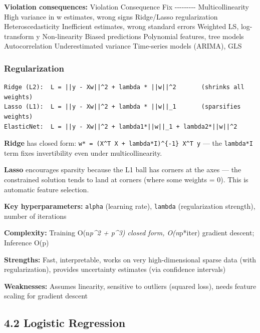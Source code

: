 \documentclass[11pt]{article}
\begin{document}
\textbf{Violation consequences:}
\textbar{} Violation \textbar{} Consequence \textbar{} Fix \textbar{}
\textbar-\/-\/-\textbar-\/-\/-\textbar-\/-\/-\textbar{}
\textbar{} Multicollinearity \textbar{} High variance in w estimates, wrong signs \textbar{} Ridge/Lasso regularization \textbar{}
\textbar{} Heteroscedasticity \textbar{} Inefficient estimates, wrong standard errors \textbar{} Weighted LS, log-transform y \textbar{}
\textbar{} Non-linearity \textbar{} Biased predictions \textbar{} Polynomial features, tree models \textbar{}
\textbar{} Autocorrelation \textbar{} Underestimated variance \textbar{} Time-series models (ARIMA), GLS \textbar{}

\subsubsection{Regularization}\label{regularization}

\setcodelang{}

\begin{verbatim}
Ridge (L2):  L = ||y - Xw||^2 + lambda * ||w||^2       (shrinks all weights)
Lasso (L1):  L = ||y - Xw||^2 + lambda * ||w||_1       (sparsifies weights)
ElasticNet:  L = ||y - Xw||^2 + lambda1*||w||_1 + lambda2*||w||^2
\end{verbatim}

\textbf{Ridge} has closed form: \texttt{w*\ =\ (X\^{}T\ X\ +\ lambda*I)\^{}\{-1\}\ X\^{}T\ y} --- the \texttt{lambda*I} term fixes invertibility even under multicollinearity.

\textbf{Lasso} encourages sparsity because the L1 ball has corners at the axes --- the constrained solution tends to land at corners (where some weights = 0). This is automatic feature selection.

\textbf{Key hyperparameters:} \texttt{alpha} (learning rate), \texttt{lambda} (regularization strength), number of iterations

\textbf{Complexity:} Training O(n\emph{p\^{}2 + p\^{}3) closed form, O(n}p*iter) gradient descent; Inference O(p)

\textbf{Strengths:} Fast, interpretable, works on very high-dimensional sparse data (with regularization), provides uncertainty estimates (via confidence intervals)

\textbf{Weaknesses:} Assumes linearity, sensitive to outliers (squared loss), needs feature scaling for gradient descent

\subsection{4.2 Logistic Regression}\label{42-logistic-regression}
\end{document}
